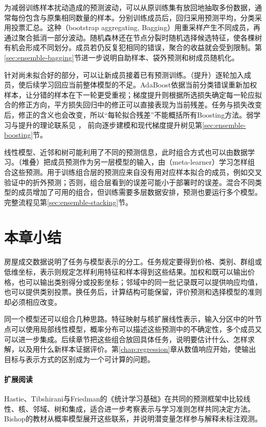 为减弱训练样本扰动造成的预测波动，可以从原训练集有放回地抽取多份数据，通常每份包含与原集相同数量的样本。分别训练成员后，回归采用预测平均，分类采用投票汇总。这种（bootstrap aggregating, Bagging）用重采样产生不同成员，再通过聚合抵消一部分波动。随机森林还在节点分裂时随机选择候选特征，使各棵树有机会形成不同划分。成员若仍反复犯相同的错误，聚合的收益就会受到限制。第\ref{sec:ensemble-bagging}节进一步说明自助样本、袋外预测和树成员随机化。

针对尚未拟合好的部分，可以让新成员接着已有预测训练。（提升）逐轮加入成员，使后续学习回应当前整体模型的不足。AdaBoost依据当前分类错误重新加权样本，让分错的样本在下一轮更受重视；梯度提升则根据所选损失确定每一轮应拟合的修正方向，平方损失回归中的修正可以直接表现为当前残差。任务与损失改变后，修正的含义也会改变，所以“每轮拟合残差”不能概括所有Boosting方法。弱学习与提升的理论联系见
，
前向逐步建模和现代梯度提升树见第\ref{sec:ensemble-boosting}节。

线性模型、近邻和树可能利用了不同的预测信息，此时组合方式也可以由数据学习。（堆叠）把成员预测作为另一层模型的输入，由（meta-learner）学习怎样组合这些预测。用于训练组合层的预测应来自没有用对应样本拟合的成员，例如交叉验证中的折外预测；否则，组合层看到的误差可能小于部署时的误差。混合不同类型的成员增加了可用的组合，但训练需要多层数据安排，预测也要运行多个模型。完整流程见第\ref{sec:ensemble-stacking}节。

\section{本章小结}
\label{sec:classic-overview-summary}

房屋成交数据说明了任务与模型表示的分工。任务规定要得到价格、类别、群组或低维坐标，表示则规定怎样利用特征和样本得到这些结果。加权和既可以输出价格，也可以输出类别得分或投影坐标；邻域中的同一批记录既可以提供响应均值，也可以提供类别投票。换任务后，计算结构可能保留，评价预测和选择模型的准则却必须相应改变。

同一个模型还可以组合几种思路。特征映射与核扩展线性表示，输入分区中的叶节点可以使用局部线性模型，概率分布可以描述这些预测中的不确定性，多个成员又可以进一步集成。后续章节把这些组合放回具体任务，说明要估计什么、怎样求解，以及用什么新样本证据评价。第\ref{chap:regression}章从数值响应开始，使输出目标与表示方式的区别成为一个可计算的问题。

\paragraph{扩展阅读}
Hastie、Tibshirani与Friedman的《统计学习基础》在共同的预测框架中比较线性、核、邻域、树和集成，适合进一步考察表示与学习准则怎样共同决定方法。Bishop的教材从概率模型展开这些联系，并说明潜变量怎样参与解释未标注观测。
